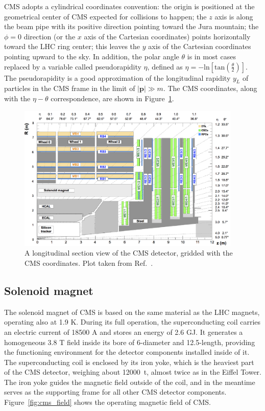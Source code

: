 CMS adopts a cylindrical coordinates convention: the origin is positioned at the geometrical center of CMS expected for collisions to happen;
the $z$ axis is along the beam pipe with its positive direction pointing toward the Jura mountain;
the $\phi = 0$ direction (or the $x$ axis of the Cartesian coordinates) points horizontally toward the LHC ring center;
this leaves the $y$ axis of the Cartesian coordinates pointing upward to the sky.
In addition, the polar angle $\theta$ is in most cases replaced by a variable called pseudorapidity $\eta$, 
defined as $\eta = -\text{ln}[\text{tan}(\frac{\theta}{2})]$.
The pseudorapidity is a good approximation of the longitudinal rapidity $y_{L}$ of particles in the CMS frame in the limit of $|\textbf{p}| \gg m$.
The CMS coordinates, along with the $\eta - \theta$ correspondence, are shown in Figure~\ref{fig:cms_longitudinal}.

\begin{figure}[!htb]
    \centering
    \captionsetup{justification=justified}
    \includegraphics[width=0.95\textwidth]{pics/LHC_CMS/CMS_longitudinal.png}
    \caption{A longitudinal section view of the CMS detector, gridded with the CMS coordinates.
             Plot taken from Ref.~\cite{Sirunyan_2018}.}
    \label{fig:cms_longitudinal}
\end{figure}


\subsection{Solenoid magnet}\label{sec:magnet}

The solenoid magnet of CMS is based on the same material as the LHC magnets, operating also at 1.9 K.
During its full operation, the superconducting coil carries an electric current of 18500 A and stores an energy of 2.6 GJ.
It generates a homogeneous 3.8 T field inside its bore of 6-\meter diameter and 12.5-\meter length,
providing the functioning environment for the detector components installed inside of it.
The superconducting coil is enclosed by its iron yoke, which is the heaviest part of the CMS detector, 
weighing about 12000~t, almost twice as in the Eiffel Tower.
The iron yoke guides the magnetic field outside of the coil, and in the meantime serves as the supporting frame for all other CMS detector components.
Figure~\ref{fig:cms_field} shows the operating magnetic field of CMS.


